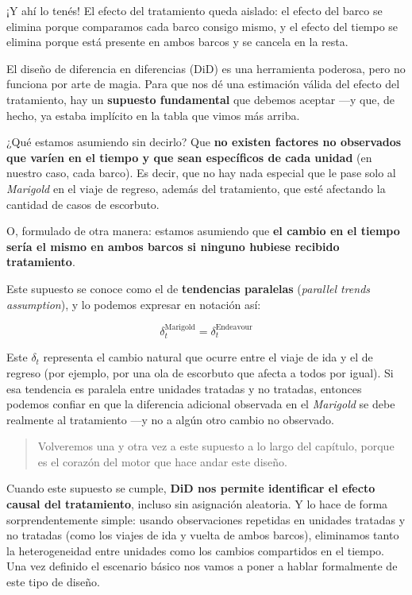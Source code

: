 \documentclass[
  letterpaper,
  DIV=11,
  numbers=noendperiod,
  oneside]{scrreprt}
\begin{document}
¡Y ahí lo tenés! El efecto del tratamiento queda aislado: el efecto del
barco se elimina porque comparamos cada barco consigo mismo, y el efecto
del tiempo se elimina porque está presente en ambos barcos y se cancela
en la resta.

El diseño de diferencia en diferencias (DiD) es una herramienta
poderosa, pero no funciona por arte de magia. Para que nos dé una
estimación válida del efecto del tratamiento, hay un \textbf{supuesto
fundamental} que debemos aceptar ---y que, de hecho, ya estaba implícito
en la tabla que vimos más arriba.

¿Qué estamos asumiendo sin decirlo? Que \textbf{no existen factores no
observados que varíen en el tiempo y que sean específicos de cada
unidad} (en nuestro caso, cada barco). Es decir, que no hay nada
especial que le pase solo al \emph{Marigold} en el viaje de regreso,
además del tratamiento, que esté afectando la cantidad de casos de
escorbuto.

O, formulado de otra manera: estamos asumiendo que \textbf{el cambio en
el tiempo sería el mismo en ambos barcos si ninguno hubiese recibido
tratamiento}.

Este supuesto se conoce como el de \textbf{tendencias paralelas}
(\emph{parallel trends assumption}), y lo podemos expresar en notación
así:

\[
\delta_t^{\text{Marigold}} = \delta_t^{\text{Endeavour}}
\]

\smallskip

Este \(\delta_t\) representa el cambio natural que ocurre entre el viaje
de ida y el de regreso (por ejemplo, por una ola de escorbuto que afecta
a todos por igual). Si esa tendencia es paralela entre unidades tratadas
y no tratadas, entonces podemos confiar en que la diferencia adicional
observada en el \emph{Marigold} se debe realmente al tratamiento ---y no
a algún otro cambio no observado.

\begin{quote}
Volveremos una y otra vez a este supuesto a lo largo del capítulo,
porque es el corazón del motor que hace andar este diseño.
\end{quote}

Cuando este supuesto se cumple, \textbf{DiD nos permite identificar el
efecto causal del tratamiento}, incluso sin asignación aleatoria. Y lo
hace de forma sorprendentemente simple: usando observaciones repetidas
en unidades tratadas y no tratadas (como los viajes de ida y vuelta de
ambos barcos), eliminamos tanto la heterogeneidad entre unidades como
los cambios compartidos en el tiempo. Una vez definido el escenario
básico nos vamos a poner a hablar formalmente de este tipo de diseño.
\end{document}
